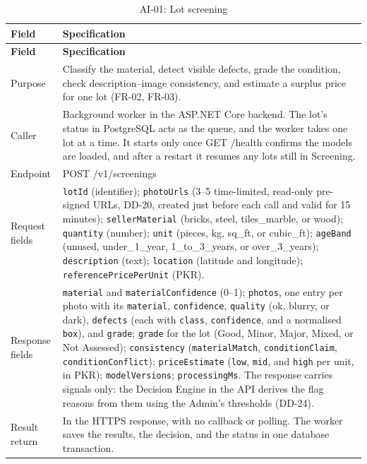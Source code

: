 {\small
\begin{longtable}{@{}>{\raggedright\arraybackslash}p{}>{\raggedright\arraybackslash}p{}@{}}
\caption{AI-01: Lot screening}\label{tab:ai-screening}\\
\toprule
\textbf{Field} & \textbf{Specification} \\
\midrule
\endfirsthead
\toprule
\textbf{Field} & \textbf{Specification} \\
\midrule
\endhead
Purpose & Classify the material, detect visible defects, grade the condition, check description--image consistency, and estimate a surplus price for one lot (FR-02, FR-03). \\
Caller & Background worker in the ASP.NET Core backend. The lot's status in PostgreSQL acts as the queue, and the worker takes one lot at a time. It starts only once GET /health confirms the models are loaded, and after a restart it resumes any lots still in Screening. \\
Endpoint & POST /v1/screenings \\
Request fields & \texttt{lotId} (identifier); \texttt{photoUrls} (3--5 time-limited, read-only pre-signed URLs, DD-20, created just before each call and valid for 15 minutes); \texttt{sellerMaterial} (bricks, steel, tiles\_marble, or wood); \texttt{quantity} (number); \texttt{unit} (pieces, kg, sq\_ft, or cubic\_ft); \texttt{ageBand} (unused, under\_1\_year, 1\_to\_3\_years, or over\_3\_years); \texttt{description} (text); \texttt{location} (latitude and longitude); \texttt{referencePricePerUnit} (PKR). \\
Response fields & \texttt{material} and \texttt{materialConfidence} (0--1); \texttt{photos}, one entry per photo with its \texttt{material}, \texttt{confidence}, \texttt{quality} (ok, blurry, or dark), \texttt{defects} (each with \texttt{class}, \texttt{confidence}, and a normalised \texttt{box}), and \texttt{grade}; \texttt{grade} for the lot (Good, Minor, Major, Mixed, or Not Assessed); \texttt{consistency} (\texttt{materialMatch}, \texttt{conditionClaim}, \texttt{conditionConflict}); \texttt{priceEstimate} (\texttt{low}, \texttt{mid}, and \texttt{high} per unit, in PKR); \texttt{modelVersions}; \texttt{processingMs}. The response carries signals only: the Decision Engine in the API derives the flag reasons from them using the Admin's thresholds (DD-24). \\
Result return & In the HTTPS response, with no callback or polling. The worker saves the results, the decision, and the status in one database transaction. \\

\end{longtable}}
